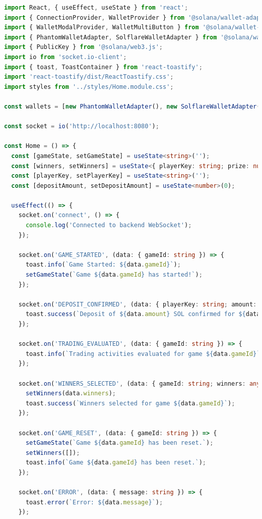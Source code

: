 \documentclass[11pt,a4paper]{article}
\begin{document}
\begin{lstlisting}[language=TypeScript, caption={Frontend Application}]
import React, { useEffect, useState } from 'react';
import { ConnectionProvider, WalletProvider } from '@solana/wallet-adapter-react';
import { WalletModalProvider, WalletMultiButton } from '@solana/wallet-adapter-react-ui';
import { PhantomWalletAdapter, SolflareWalletAdapter } from '@solana/wallet-adapter-wallets';
import { PublicKey } from '@solana/web3.js';
import io from 'socket.io-client';
import { toast, ToastContainer } from 'react-toastify';
import 'react-toastify/dist/ReactToastify.css';
import styles from '../styles/Home.module.css';

const wallets = [new PhantomWalletAdapter(), new SolflareWalletAdapter()];

const socket = io('http://localhost:8080');

const Home = () => {
  const [gameState, setGameState] = useState<string>('');
  const [winners, setWinners] = useState<{ playerKey: string; prize: number }[]>([]);
  const [playerKey, setPlayerKey] = useState<string>('');
  const [depositAmount, setDepositAmount] = useState<number>(0);

  useEffect(() => {
    socket.on('connect', () => {
      console.log('Connected to backend WebSocket');
    });

    socket.on('GAME_STARTED', (data: { gameId: string }) => {
      toast.info(`Game Started: ${data.gameId}`);
      setGameState(`Game ${data.gameId} has started!`);
    });

    socket.on('DEPOSIT_CONFIRMED', (data: { playerKey: string; amount: number }) => {
      toast.success(`Deposit of ${data.amount} SOL confirmed for ${data.playerKey}`);
    });

    socket.on('TRADING_EVALUATED', (data: { gameId: string }) => {
      toast.info(`Trading activities evaluated for game ${data.gameId}`);
    });

    socket.on('WINNERS_SELECTED', (data: { gameId: string; winners: any[] }) => {
      setWinners(data.winners);
      toast.success(`Winners selected for game ${data.gameId}`);
    });

    socket.on('GAME_RESET', (data: { gameId: string }) => {
      setGameState(`Game ${data.gameId} has been reset.`);
      setWinners([]);
      toast.info(`Game ${data.gameId} has been reset.`);
    });

    socket.on('ERROR', (data: { message: string }) => {
      toast.error(`Error: ${data.message}`);
    });


\end{lstlisting}
\end{document}

